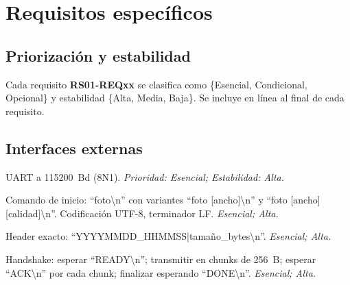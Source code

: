 \documentclass[11pt,codirector]{charter}
\makeatletter
\newcommand{\SI}[2]{#1~#2}
\newcommand{\baud}{Bd}
\newcommand{\byte}{B}
\newcommand{\mytwodigits}[1]{\two@digits{#1}}
\newcounter{reqCounter}
\def\texttt#1{#1}%
\makeatother
\begin{document}
	\section{Requisitos específicos}
	
	\subsection{Priorización y estabilidad}
	Cada requisito \textbf{RS01-REQxx} se clasifica como \{Esencial, Condicional, Opcional\} y estabilidad \{Alta, Media, Baja\}. Se incluye en línea al final de cada requisito.
	
	\subsection{Interfaces externas}
	\label{sec:interfaces}
	\begin{description}[leftmargin=1.8cm,style=nextline]
		\item[\textbf{[\CODrequerimiento\mytwodigits{\value{reqCounter}}]}]
		UART a \SI{115200}{\baud} (8N1). \emph{Prioridad: Esencial; Estabilidad: Alta.}
		
		\item[\textbf{[\CODrequerimiento\mytwodigits{\value{reqCounter}}]}]
		Comando de inicio: ``\texttt{foto\textbackslash n}'' con variantes ``\texttt{foto [ancho]\textbackslash n}'' y ``\texttt{foto [ancho] [calidad]\textbackslash n}''. Codificación UTF-8, terminador LF. \emph{Esencial; Alta.}
		
		\item[\textbf{[\CODrequerimiento\mytwodigits{\value{reqCounter}}]}]
		Header exacto: ``\texttt{YYYYMMDD\_HHMMSS|tamaño\_bytes\textbackslash n}''. \emph{Esencial; Alta.}
		
		\item[\textbf{[\CODrequerimiento\mytwodigits{\value{reqCounter}}]}]
		Handshake: esperar ``\texttt{READY\textbackslash n}''; transmitir en chunks de \SI{256}{\byte}; esperar ``\texttt{ACK\textbackslash n}'' por cada chunk; finalizar esperando ``\texttt{DONE\textbackslash n}''. \emph{Esencial; Alta.}
	\end{description}
	
\end{document}

